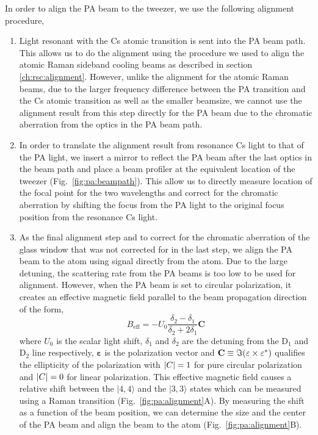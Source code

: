 In order to align the PA beam to the tweezer, we use the following alignment procedure,
\begin{enumerate}
\item Light resonant with the Cs atomic transition is sent into the PA beam path.
  This allows us to do the alignment using the procedure we used to align the
  atomic Raman sideband cooling beams as described in section \ref{ch:rsc:alignment}.
  However, unlike the alignment for the atomic Raman beams,
  due to the larger frequency difference between the PA transition and the Cs atomic
  transition as well as the smaller beamsize,
  we cannot use the alignment result from this step directly for the PA beam
  due to the chromatic aberration from the optics in the PA beam path.
\item In order to translate the alignment result from resonance Cs light to that of the PA light,
  we insert a mirror to reflect the PA beam after the last optics in the beam path
  and place a beam profiler at the equivalent location of the tweezer
  (Fig.~\ref{fig:pa:beampath}).
  This allow us to directly measure location of the focal point for the two wavelengths
  and correct for the chromatic aberration by shifting the focus from the PA light
  to the original focus position from the resonance Cs light.
\item As the final alignment step and to correct for the chromatic aberration of the
  glass window that was not corrected for in the last step,
  we align the PA beam to the atom using signal directly from the atom.
  Due to the large detuning, the scattering rate from the PA beams
  is too low to be used for alignment.
  However, when the PA beam is set to circular polarization, it creates an effective
  magnetic field parallel to the beam propagation direction
  of the form\cite{thompson_coherence_2013},
  \[ B_{\mathrm{eff}}=-U_0\frac{\delta_2-\delta_1}{\delta_2+2\delta_1}\mathbf{C} \]
  where $U_0$ is the scalar light shift, $\delta_1$ and $\delta_2$ are the detuning from the
  $\mathrm{D}_1$ and $\mathrm{D}_2$ line respectively,
  $\mathbf{\varepsilon}$ is the polarization vector and
  $\mathbf{C}\equiv\Im{\left({\mathbf{\varepsilon}\times\mathbf{\varepsilon}^*}\right)}$
  qualifies the ellipticity of the polarization with
  ${\left|{C}\right|}=1$ for pure circular polarization and ${\left|{C}\right|}=0$ for linear polarization.
  This effective magnetic field causes a relative shift between the $|4,4\rangle$
  and the $|3,3\rangle$ states which can be measured using a Raman transition
  (Fig.~\ref{fig:pa:alignment}A).
  By measuring the shift as a function of the beam position,
  we can determine the size and the center of the PA beam and align the beam to the atom
  (Fig.~\ref{fig:pa:alignment}B).
\end{enumerate}

